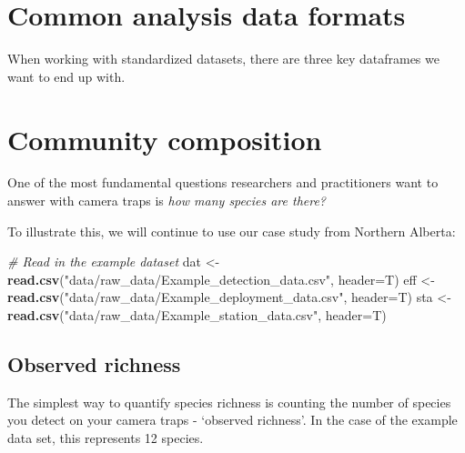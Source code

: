 \documentclass[]{book}
\newenvironment{Shaded}{\begin{snugshade}}{\end{snugshade}}
\newcommand{\KeywordTok}[1]{\textcolor[rgb]{0.13,0.29,0.53}{\textbf{#1}}}
\newcommand{\DataTypeTok}[1]{\textcolor[rgb]{0.13,0.29,0.53}{#1}}
\newcommand{\StringTok}[1]{\textcolor[rgb]{0.31,0.60,0.02}{#1}}
\newcommand{\CommentTok}[1]{\textcolor[rgb]{0.56,0.35,0.01}{\textit{#1}}}
\newcommand{\NormalTok}[1]{#1}
\begin{document}
\chapter{Common analysis data
formats}\label{common-analysis-data-formats}

When working with standardized datasets, there are three key dataframes
we want to end up with.

\chapter{Community composition}\label{community-composition}

One of the most fundamental questions researchers and practitioners want
to answer with camera traps is \emph{how many species are there?}

To illustrate this, we will continue to use our case study from Northern
Alberta:

\begin{Shaded}
\begin{Highlighting}[]
\CommentTok{# Read in the example dataset}
\NormalTok{dat <-}\StringTok{ }\KeywordTok{read.csv}\NormalTok{(}\StringTok{"data/raw_data/Example_detection_data.csv"}\NormalTok{, }\DataTypeTok{header=}\NormalTok{T)}
\NormalTok{eff <-}\StringTok{ }\KeywordTok{read.csv}\NormalTok{(}\StringTok{"data/raw_data/Example_deployment_data.csv"}\NormalTok{, }\DataTypeTok{header=}\NormalTok{T)}
\NormalTok{sta <-}\StringTok{ }\KeywordTok{read.csv}\NormalTok{(}\StringTok{"data/raw_data/Example_station_data.csv"}\NormalTok{, }\DataTypeTok{header=}\NormalTok{T)}
\end{Highlighting}
\end{Shaded}

\section{Observed richness}\label{observed-richness}

The simplest way to quantify species richness is counting the number of
species you detect on your camera traps - `observed richness'. In the
case of the example data set, this represents 12 species.
\end{document}
